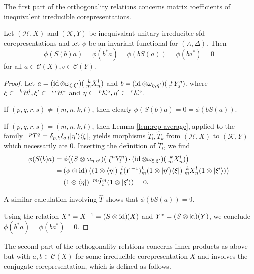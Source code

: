 The first part of the orthogonality relations concerns matrix
coefficients of inequivalent irreducible corepresentations.
\begin{Prop} \label{prop:rep-orthogonality-1}
  Let $(\mathcal{H},X)$ and $(\mathcal{K},Y)$ be inequivalent unitary
  irreducible sfd corepresentations and let
  $\phi$ be an invariant functional for $(A,\Delta)$.  Then
  \[\phi(S(b)a) =\phi(b^{*}a) = \phi(bS(a))=\phi(ba^{*})=0\] for all
  $a\in \mathcal{C}(X), b \in \mathcal{C}(Y)$.
\end{Prop}
\begin{proof}
  Let $a=(\id \otimes \omega_{\xi,\xi'})(\Gr{X}{k}{l}{m}{n})$ and
  $b=(\id \otimes \omega_{\eta,\eta'})(\Gr{Y}{p}{q}{r}{s})$, where
  $\xi \in \Gru{\mathcal{H}}{k}{l}, \xi' \in \Gru{\mathcal{H}}{m}{n}$
  and $\eta \in \Gru{\mathcal{K}}{p}{q}, \eta' \in
  \Gru{\mathcal{K}}{r}{s}$. 
  
  If $(p,q,r,s) \neq (m,n,k,l)$, then clearly $\phi(S(b)a) = 0 = \phi(bS(a))$.
  
   If $(p,q,r,s) = (m,n,k,l)$,  then Lemma \ref{lem:rep-average}, applied to the 
  family $\Gru{T}{p}{q}= \delta_{p,k}\delta_{q,l}
  |\eta'\rangle\langle\xi|$, yields  morphisms $\check{T}_l,\hat{T}_k$
  from $(\mathcal{H},X)$ to $(\mathcal{K},Y)$ which necessarily are
  $0$. Inserting the definition of $\check{T}_l$, we find
  \begin{align*}
    \phi(S(b)a) &= \phi\big((S \otimes
    \omega_{\eta,\eta'})(\Gr{Y}{m}{n}{k}{l}) \cdot (\id \otimes
    \omega_{\xi,\xi'})(\Gr{X}{k}{l}{m}{n})\big) \\ &= (\phi \otimes
    \id)\left((1\otimes \langle\eta|) \Gr{(Y^{-1})}{l}{k}{n}{m}(1 \otimes
      |\eta'\rangle\langle \xi|)
      \Gr{X}{k}{l}{m}{n}(1\otimes |\xi'\rangle)\right) 
   \\ &= (1\otimes \langle \eta|) \Gru{\check{T}_l}{m}{n}(1\otimes |\xi'\rangle) = 0.
  \end{align*}%
  
  A similar calculation involving $\hat{T}$ shows that
  $\phi(bS(a))=0$.  
  
  Using the relation $X^{*}=X^{-1}=(S\otimes
  \id)(X)$ and $Y^{*}=(S\otimes \id)(Y)$, we conclude
  $\phi(b^{*}a)=\phi(ba^{*})=0$.
\end{proof}

The second part of the orthogonality relations concerns inner products
as above but with $a,b\in \mathcal{C}(X)$ for some irreducible
corepresentation  $X$  and involves the conjugate corepresentation,
which is defined as follows.



